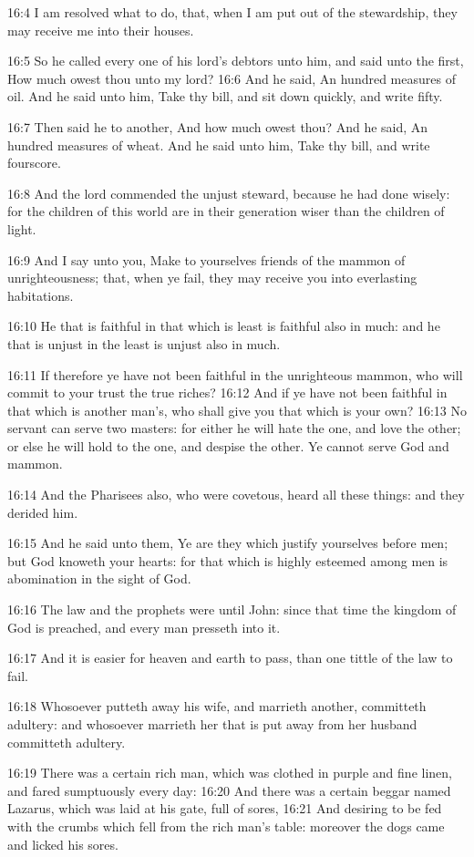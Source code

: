16:4 I am resolved what to do, that, when I am put out of the stewardship, they may receive me into their houses.

16:5 So he called every one of his lord's debtors unto him, and said unto the first, How much owest thou unto my lord?  16:6 And he said, An hundred measures of oil. And he said unto him, Take thy bill, and sit down quickly, and write fifty.

16:7 Then said he to another, And how much owest thou? And he said, An hundred measures of wheat. And he said unto him, Take thy bill, and write fourscore.

16:8 And the lord commended the unjust steward, because he had done wisely: for the children of this world are in their generation wiser than the children of light.

16:9 And I say unto you, Make to yourselves friends of the mammon of unrighteousness; that, when ye fail, they may receive you into everlasting habitations.

16:10 He that is faithful in that which is least is faithful also in much: and he that is unjust in the least is unjust also in much.

16:11 If therefore ye have not been faithful in the unrighteous mammon, who will commit to your trust the true riches?  16:12 And if ye have not been faithful in that which is another man's, who shall give you that which is your own?  16:13 No servant can serve two masters: for either he will hate the one, and love the other; or else he will hold to the one, and despise the other. Ye cannot serve God and mammon.

16:14 And the Pharisees also, who were covetous, heard all these things: and they derided him.

16:15 And he said unto them, Ye are they which justify yourselves before men; but God knoweth your hearts: for that which is highly esteemed among men is abomination in the sight of God.

16:16 The law and the prophets were until John: since that time the kingdom of God is preached, and every man presseth into it.

16:17 And it is easier for heaven and earth to pass, than one tittle of the law to fail.

16:18 Whosoever putteth away his wife, and marrieth another, committeth adultery: and whosoever marrieth her that is put away from her husband committeth adultery.

16:19 There was a certain rich man, which was clothed in purple and fine linen, and fared sumptuously every day: 16:20 And there was a certain beggar named Lazarus, which was laid at his gate, full of sores, 16:21 And desiring to be fed with the crumbs which fell from the rich man's table: moreover the dogs came and licked his sores.

